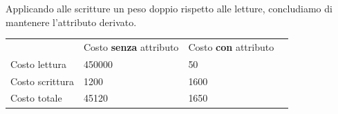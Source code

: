 \documentclass{article}
\begin{document}
Applicando alle scritture un peso doppio rispetto alle letture, concludiamo di mantenere l'attributo derivato.
\begin{table}[H]
\renewcommand{\arraystretch}{1.2}
\centering
\begin{tabular}{|p{}|l|l|l|}
\cline{1-3}
& Costo \textbf{senza} attributo & Costo \textbf{con} attributo \\ \cline{1-3}
Costo lettura & 450000 & 50 \\ \cline{1-3}
Costo scrittura & 1200 & 1600 \\ \cline{1-3}
Costo totale & 45120 & 1650 \\ \cline{1-3}
\end{tabular}
\end{table}

\newpage
\end{document}
